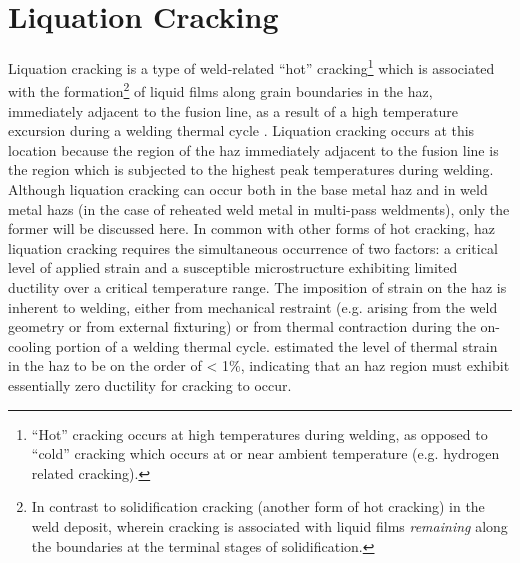 
\section{Liquation Cracking} \label{sec:liquation-cracking}
Liquation cracking is a type of weld-related “hot” cracking\footnote{“Hot” cracking occurs at high temperatures during welding, as opposed to “cold” cracking which occurs at or near ambient temperature (e.g. hydrogen related cracking).} which is associated with the formation\footnote{In contrast to solidification cracking (another form of hot cracking) in the weld deposit, wherein cracking is associated with liquid films \emph{remaining} along the boundaries at the terminal stages of solidification.} of liquid films along grain boundaries in the \gls{haz}, immediately adjacent to the fusion line, as a result of a high temperature excursion during a welding thermal cycle  \cite{lippold_welding_2014}. Liquation cracking occurs at this location because the region of the \gls{haz} immediately adjacent to the fusion line is the region which is subjected to the highest peak temperatures during welding. Although liquation cracking can occur both in the base metal \gls{haz} and in weld metal \gls{haz}s (in the case of reheated weld metal in multi-pass weldments), only the former will be discussed here. In common with other forms of hot cracking, \gls{haz} liquation cracking requires the simultaneous occurrence of two factors: a critical level of applied strain and a susceptible microstructure exhibiting limited ductility over a critical temperature range. The imposition of strain on the \gls{haz} is inherent to welding, either from mechanical restraint (e.g. arising from the weld geometry or from external fixturing) or from thermal contraction during the on-cooling portion of a welding thermal cycle. \citet{yeniscavich_correlation_1970} estimated the level of thermal strain in the \gls{haz} to be on the order of < 1\%, indicating that an \gls{haz} region must exhibit essentially zero ductility for cracking to occur. 


